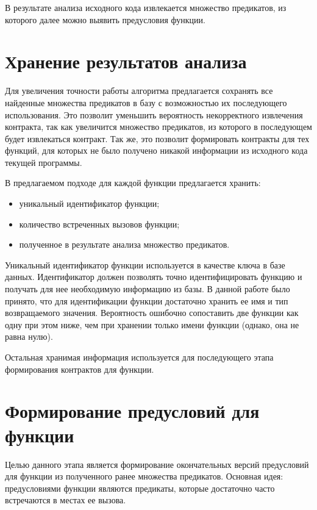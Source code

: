 В результате анализа исходного кода извлекается множество предикатов, из которого далее можно выявить предусловия функции.

\section{Хранение результатов анализа}
\label{section:saving}
Для увеличения точности работы алгоритма предлагается сохранять все найденные множества предикатов в базу с возможностью их последующего использования. Это позволит уменьшить вероятность некорректного извлечения контракта, так как увеличится множество предикатов, из которого в последующем будет извлекаться контракт. Так же, это позволит формировать контракты для тех функций, для которых не было получено никакой информации из исходного кода текущей программы.

В предлагаемом подходе для каждой функции предлагается хранить:
\begin{itemize}
\item уникальный идентификатор функции;
\item количество встреченных вызовов функции;
\item полученное в результате анализа множество предикатов.
\end{itemize}

Уникальный идентификатор функции используется в качестве ключа в базе данных. Идентификатор должен позволять точно идентифицировать функцию и получать для нее необходимую информацию из базы. В данной работе было принято, что для идентификации функции достаточно хранить ее имя и тип возвращаемого значения. Вероятность ошибочно сопоставить две функции как одну при этом ниже, чем при хранении только имени функции (однако, она не равна нулю).

Остальная хранимая информация используется для последующего этапа формирования контрактов для функции.

\section{Формирование предусловий для функции}
\label{section:merging}
Целью данного этапа является формирование окончательных версий предусловий для функции из полученного ранее множества предикатов. Основная идея: предусловиями функции являются предикаты, которые достаточно часто встречаются в местах ее вызова. 

